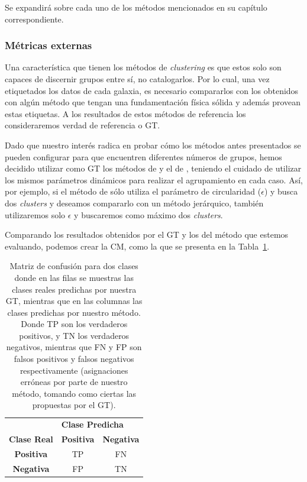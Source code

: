 Se expandirá sobre cada uno de los métodos mencionados en su capítulo correspondiente.

\subsubsection{Métricas externas}

Una característica que tienen los métodos de \textit{clustering} es que estos solo son capaces de discernir grupos entre sí, no catalogarlos. Por lo cual, una vez etiquetados los datos de cada galaxia, es necesario compararlos con los obtenidos con algún método que tengan una fundamentación física sólida y además provean estas etiquetas. A los resultados de estos métodos de referencia los consideraremos verdad de referencia o \gls{GT}.

Dado que nuestro interés radica en probar cómo los métodos antes presentados se pueden configurar para que encuentren diferentes números de grupos, hemos decidido utilizar como \gls{GT} los métodos de \citet{abadi2003simulations} y el de \citet{du2019identifying}, teniendo el cuidado de utilizar los mismos parámetros dinámicos para realizar el agrupamiento en cada caso. Así, por ejemplo, si el método de \citet{abadi2003simulations} sólo utiliza el parámetro de circularidad ($\epsilon$) y busca dos \textit{clusters} y deseamos compararlo con un método jerárquico, también utilizaremos solo $\epsilon$ y buscaremos como máximo dos \textit{clusters}.

Comparando los resultados obtenidos por el \gls{GT} y los del método que estemos evaluando, podemos crear la \gls{CM}, como la que se presenta en la Tabla~\ref{tab:conf_mtx}.

\begin{table}[]
    \centering
    \begin{tabular}{c|c|c}
         {}                   & \multicolumn{2}{l}{\hfil \textbf{Clase Predicha}} \\
         \textbf{Clase Real}  & \textbf{Positiva}  &  \textbf{Negativa}                        \\
         \textbf{Positiva }            &  \gls{TP}       & \gls{FN}                               \\
         \textbf{Negativa}             &  \gls{FP}       & \gls{TN}
    \end{tabular}
    \caption{Matriz de confusión para dos clases donde en las filas se muestras las clases reales predichas por nuestra \gls{GT}, mientras que en las columnas las clases predichas por nuestro método. Donde \gls{TP} son los verdaderos positivos, y \gls{TN} los verdaderos negativos, mientras que \gls{FN} y \gls{FP} son falsos positivos y falsos negativos respectivamente (asignaciones erróneas por parte de nuestro método, tomando como ciertas las propuestas por el \gls{GT}).}
    \label{tab:conf_mtx}
\end{table}

